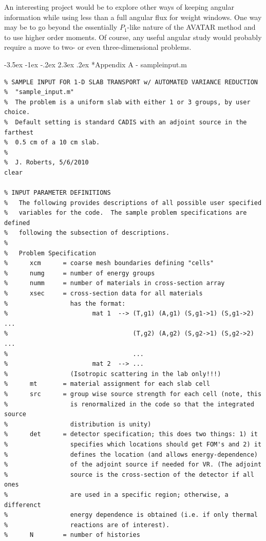 \documentclass[letter,11pt]{article}
\makeatletter
\renewcommand\section{\@startsection{section}{1}{\z@}%
                                {-3.5ex \@plus -1ex \@minus -.2ex}%
                                {2.3ex \@plus.2ex}%
                                {\normalfont\large\bf}}
\makeatother
\begin{document}
An interesting project would be to explore other ways of keeping angular information while using less than a full angular flux for weight windows.  One way may be to go beyond the essentially $P_1$-like nature of the AVATAR method and to use higher order moments.  Of course, any useful angular study would probably require a move to two- or even three-dimensional problems.  

{\small


}

\newpage

\section*{Appendix A - {\sf sampleinput.m} }
\label{app:input}
{\small
\begin{verbatim}
% SAMPLE INPUT FOR 1-D SLAB TRANSPORT w/ AUTOMATED VARIANCE REDUCTION
%  "sample_input.m"
%  The problem is a uniform slab with either 1 or 3 groups, by user choice.
%  Default setting is standard CADIS with an adjoint source in the farthest
%  0.5 cm of a 10 cm slab.
%
%  J. Roberts, 5/6/2010
clear

% INPUT PARAMETER DEFINITIONS
%   The following provides descriptions of all possible user specified
%   variables for the code.  The sample problem specifications are defined
%   following the subsection of descriptions.
%
%   Problem Specification
%      xcm      = coarse mesh boundaries defining "cells"
%      numg     = number of energy groups
%      numm     = number of materials in cross-section array
%      xsec     = cross-section data for all materials
%                 has the format:
%                       mat 1  --> (T,g1) (A,g1) (S,g1->1) (S,g1->2) ...
%                                  (T,g2) (A,g2) (S,g2->1) (S,g2->2) ...
%                                  ...
%                       mat 2  --> ...
%                 (Isotropic scattering in the lab only!!!)
%      mt       = material assignment for each slab cell
%      src      = group wise source strength for each cell (note, this
%                 is renormalized in the code so that the integrated source
%                 distribution is unity)
%      det      = detector specification; this does two things: 1) it
%                 specifies which locations should get FOM's and 2) it
%                 defines the location (and allows energy-dependence)
%                 of the adjoint source if needed for VR. (The adjoint 
%                 source is the cross-section of the detector if all ones 
%                 are used in a specific region; otherwise, a differenct
%                 energy dependence is obtained (i.e. if only thermal
%                 reactions are of interest).
%      N        = number of histories


\end{verbatim}}
\end{document}
